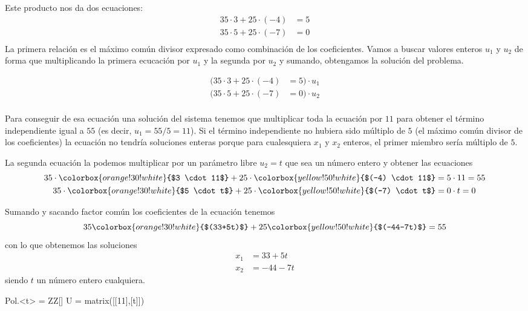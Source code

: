 \documentclass{amsart}
\begin{document}
Este producto nos da dos ecuaciones:
\begin{align*}
35 \cdot 3 + 25 \cdot (-4) &= 5 \\
35 \cdot 5 + 25 \cdot (-7) &= 0 \\
\end{align*}
La primera relación es el máximo común divisor expresado como combinación
de los coeficientes. Vamos a buscar valores enteros $u_1$ y $u_2$ de forma
que multiplicando la primera ecucación por $u_1$ y la segunda por $u_2$
y sumando, obtengamos la solución del problema. 

\begin{align*}
\Big( 35 \cdot 3 + 25 \cdot (-4) &= 5 \Big) \cdot u_1 \\
\Big( 35 \cdot 5 + 25 \cdot (-7) &= 0 \Big) \cdot u_2 \\
\end{align*}

Para conseguir de esa ecuación una solución del 
sistema tenemos que multiplicar toda la ecuación por $11$ para obtener
el término independiente igual a $55$ (es decir, $u_1 = 55/5 = 11$). 
Si el término independiente no 
hubiera sido múltiplo de $5$ (el máximo común divisor de los coeficientes)
la ecuación no tendría soluciones enteras porque para cualesquiera $x_1$ y 
$x_2$ enteros, el primer miembro sería múltiplo de $5$. 

La segunda ecuación la podemos multiplicar por un parámetro libre 
$u_2 = t$ que sea un número entero y obtener las ecuaciones
\begin{align*}
35 \cdot \colorbox{orange!30!white}{$3 \cdot 11$} + 
25 \cdot \colorbox{yellow!50!white}{$(-4) \cdot 11$} &= 5 \cdot 11 = 55 \\
35 \cdot \colorbox{orange!30!white}{$5 \cdot t$} + 
25 \cdot \colorbox{yellow!50!white}{$(-7) \cdot t$} &= 0 \cdot t = 0 \\
\end{align*}

Sumando y sacando factor común los coeficientes de la ecuación tenemos
$$ 35\colorbox{orange!30!white}{$(33+5t)$} + 
25\colorbox{yellow!50!white}{$(-44-7t)$} = 55$$
con lo que obtenemos las soluciones
\begin{align*}
x_1 &= 33+5t \\
x_2 &= -44-7t
\end{align*}
siendo $t$ un número entero cualquiera.

\begin{sageblock}
Pol.<t> = ZZ[]
U = matrix([[11],[t]])
\end{sageblock}
\end{document}
